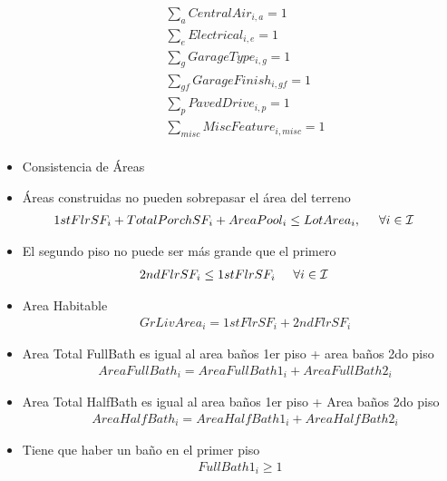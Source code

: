 \begin{itemize}
\begin{align}
    &\sum_{a} CentralAir_{i,a}=1\\
    
    &\sum_{e} Electrical_{i,e}=1\\
    
    &\sum_{g} GarageType_{i,g}=1\\
    
    &\sum_{gf} GarageFinish_{i,gf}=1\\
    
    &\sum_{p} PavedDrive_{i,p}=1\\
    
    &\sum_{misc} MiscFeature_{i,misc}=1\\
 
\end{align}
    \item{Consistencia de Áreas}\\
    \item {Áreas construidas no pueden sobrepasar el área del terreno}\\
\begin{align}
    &1stFlrSF_{i} + TotalPorchSF_{i} + AreaPool_{i} \leq LotArea_{i}, \hspace{5mm}\forall i \in \mathcal{I} 
\end{align}
    \item {El segundo piso no puede ser más grande que el primero}
\begin{align}
    &2ndFlrSF_{i} \leq 1stFlrSF_{i} \hspace{5mm}\forall i \in \mathcal{I}
\end{align}
    \item {Area Habitable}
\begin{align}
    &GrLivArea_{i} = 1stFlrSF_{i} + 2ndFlrSF_{i}
\end{align}
    \item {Area Total FullBath  es igual al area baños 1er piso + area baños 2do piso}
\begin{align}
    &AreaFullBath_{i}=AreaFullBath1_{i}+ AreaFullBath2_{i}
\end{align}
    \item {Area Total HalfBath es igual al area baños 1er piso + Area baños 2do piso}
\begin{align}
    &AreaHalfBath_{i}=AreaHalfBath1_{i}+AreaHalfBath2_{i}
\end{align}
    \item{Tiene que haber un baño en el primer piso}
\begin{align}
    FullBath1_{i}\geq 1
\end{align}


\end{itemize}
